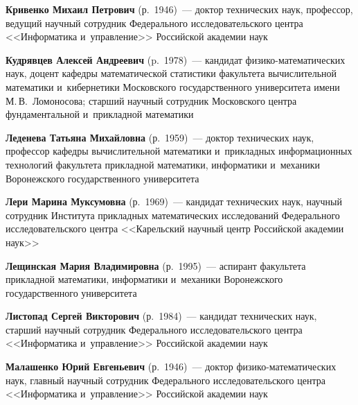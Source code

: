 \begin{multicols}{2}
\vspace*{2pt}

\noindent
\textbf{Кривенко Михаил Петрович} (р.\ 1946)~---
 доктор технических наук, профессор, ведущий научный сотрудник Федерального исследовательского цент\-ра <<Информатика и~управ\-ле\-ние>>
 Российской академии наук
 
\vspace*{2pt}

 \noindent
 \textbf{Кудрявцев Алексей Андреевич} (p.\ 1978)~--- кандидат фи\-зи\-ко-ма\-те\-ма\-ти\-че\-ских наук, доцент ка\-фед\-ры 
 математической ста\-ти\-сти\-ки факультета вы\-чис\-ли\-тель\-ной математики и~кибернетики Московского государственного 
 университета имени М.\,В.~Ломоносова; старший научный сотрудник Московского цент\-ра фундаментальной и~при\-клад\-ной ма\-те\-ма\-тики

\vspace*{2pt}

\noindent
\textbf{Леденева Татьяна Михайловна} (р.\ 1959)~---
 доктор технических наук, профессор ка\-фед\-ры вы\-чис\-ли\-тель\-ной математики и~при\-клад\-ных информационных технологий факультета 
 при\-клад\-ной математики, информатики и~механики Воронежского \mbox{государственного} университета

\vspace*{2pt}

\noindent
\textbf{Лери Марина Муксумовна} (р.\ 1969)~--- кандидат технических наук, научный сотрудник 
Института при\-клад\-ных математических исследований Федерального исследовательского центра <<Карельский научный центр Российской академии наук>>

\vspace*{2pt}

\noindent
\textbf{Лещинская Мария Владимировна} (р.\ 1995)~---
 аспирант факультета при\-клад\-ной математики, информатики и~механики Воронежского государственного университета

\vspace*{2pt}

\noindent
\textbf{Листопад Сергей Викторович} (р.\ 1984)~--- 
кандидат технических наук, старший научный сотрудник Федерального исследовательского цент\-ра <<Информатика и~управ\-ле\-ние>> Российской академии наук

\vspace*{2pt}

\noindent
\textbf{Малашенко Юрий Евгеньевич} (р.\ 1946)~--- доктор фи\-зи\-ко-ма\-те\-ма\-ти\-че\-ских наук, 
главный научный сотрудник Федерального исследовательского цент\-ра <<Информатика и~управ\-ле\-ние>> Российской академии наук


\end{multicols}
